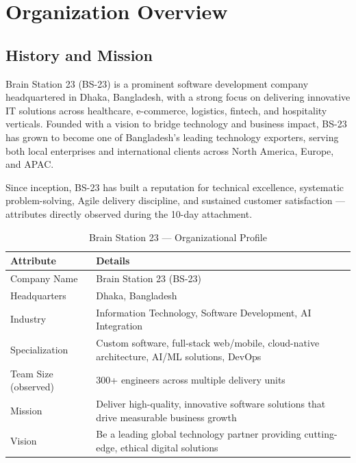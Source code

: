 \chapter{Organization Overview}
\label{ch:org}

\section{History and Mission}
\label{sec:history}

Brain Station 23 (BS-23) is a prominent software development company headquartered in Dhaka, Bangladesh, with a strong focus on delivering innovative IT solutions across healthcare, e-commerce, logistics, fintech, and hospitality verticals. Founded with a vision to bridge technology and business impact, BS-23 has grown to become one of Bangladesh's leading technology exporters, serving both local enterprises and international clients across North America, Europe, and APAC.

Since inception, BS-23 has built a reputation for technical excellence, systematic problem-solving, Agile delivery discipline, and sustained customer satisfaction --- attributes directly observed during the 10-day attachment.

\begin{table}[H]
\centering
\caption{Brain Station 23 --- Organizational Profile}
\label{tab:bs23_profile}
\begin{tabularx}{\textwidth}{@{}p{}X@{}}
\toprule
\textbf{Attribute} & \textbf{Details} \\
\midrule
Company Name & Brain Station 23 (BS-23) \\
Headquarters & Dhaka, Bangladesh \\
Industry & Information Technology, Software Development, AI Integration \\
Specialization & Custom software, full-stack web/mobile, cloud-native architecture, AI/ML solutions, DevOps \\
Team Size (observed) & 300+ engineers across multiple delivery units \\
Mission & Deliver high-quality, innovative software solutions that drive measurable business growth \\
Vision & Be a leading global technology partner providing cutting-edge, ethical digital solutions \\
\bottomrule
\end{tabularx}
\end{table}

